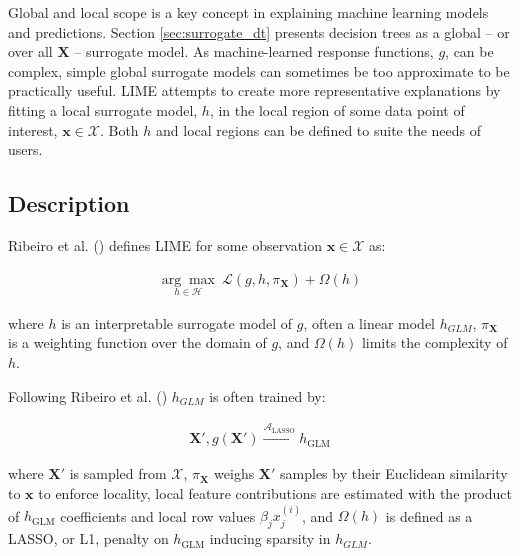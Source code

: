 \documentclass{article}
\begin{document}
Global and local scope is a key concept in explaining machine learning models and predictions. Section \ref{sec:surrogate_dt} presents decision trees as a global -- or over all $\mathbf{X}$ -- surrogate model. As machine-learned response functions, $g$, can be complex, simple global surrogate models can sometimes be too approximate to be practically useful. LIME attempts to create more representative explanations by fitting a local surrogate model, $h$, in the local region of some data point of interest, $\mathbf{x} \in \mathcal{X}$. Both $h$ and local regions can be defined to suite the needs of users.

\subsection{Description}

Ribeiro et al. (\citeyear{lime}) defines LIME for some observation $\mathbf{x} \in \mathcal{X}$ as:

\begin{equation}
\begin{aligned}
\underset{h \in \mathcal{H}}{\arg\max}\:\mathcal{L}(g, h, \pi_{\mathbf{X}}) + \Omega(h)
\end{aligned}
\end{equation}

where $h$ is an interpretable surrogate model of $g$, often a linear model $h_{GLM}$, $\pi_{\mathbf{X}}$ is a weighting function over the domain of $g$, and $\Omega(h)$ limits the complexity of $h$.

\vspace{5pt}

Following Ribeiro et al. (\citeyear{lime}) $h_{GLM}$ is often trained by:

\begin{equation}
\begin{aligned}
\mathbf{X}', g(\mathbf{X}') \xrightarrow{\mathcal{A}_{\text{LASSO}}} h_{\text{GLM}}
\end{aligned}
\end{equation}

where $\mathbf{X}'$ is sampled from $\mathcal{X}$, $\pi_{\mathbf{X}}$ weighs $\mathbf{X}'$ samples by their Euclidean similarity to $\mathbf{x}$ to enforce locality, local feature contributions are estimated with the product of $h_{\text{GLM}}$ coefficients and local row values $\beta_j x^{(i)}_j$, and $\Omega(h)$ is defined as a LASSO, or L1, penalty on $h_{\text{GLM}}$ inducing sparsity in $h_{GLM}$. 		
\end{document}

